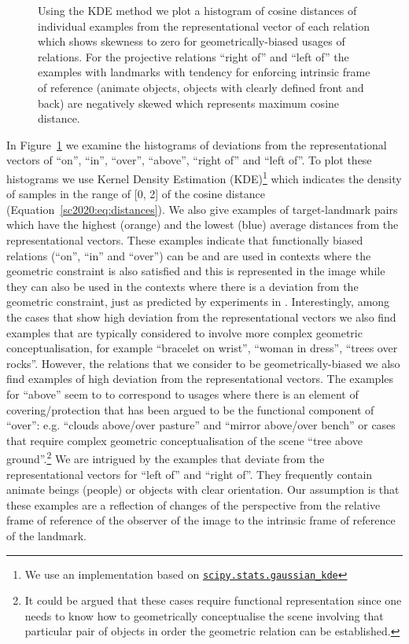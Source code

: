 \begin{figure}
\begin{minipage}{0.5\textwidth}
	\end{minipage}%
	\caption{Using the KDE method we plot a histogram of cosine distances of individual examples from the representational vector of each relation which shows skewness to zero for geometrically-biased usages of relations. For the projective relations ``right of'' and ``left of'' the examples with landmarks with tendency for enforcing intrinsic frame of reference (animate objects, objects with clearly defined front and back) are negatively skewed which represents maximum cosine distance. %
        }\label{sc2020:fig:what_hist}
\end{figure}




In Figure~\ref{sc2020:fig:what_hist} we examine the histograms of deviations
from the representational vectors of ``on'', ``in'', ``over'',
``above'', ``right of'' and ``left of''.  To plot these histograms we
use Kernel Density Estimation (KDE)\footnote{We use an implementation based on  \href{https://docs.scipy.org/doc/scipy/reference/generated/scipy.stats.gaussian_kde.html}{\texttt{scipy.stats.gaussian\_kde}}} \cite{scott2015multivariate} which
indicates the density of samples in the range of [0, 2] of the cosine
distance (Equation~\ref{sc2020:eq:distances}). We also give examples of
target-landmark pairs which have the highest (orange) and the lowest
(blue) average distances from the representational vectors. These
examples indicate that functionally biased relations (``on'', ``in''
and ``over'') can be and are used in contexts where the geometric
constraint is also satisfied and this is represented in the image
while they can also be used in the contexts where there is a deviation
from the geometric constraint, just as predicted by experiments in
\cite{CoventryEtAl:2001}. Interestingly, among the cases that show
high deviation from the representational vectors we also find examples
that are typically considered to involve more complex geometric
conceptualisation, for example ``bracelet on wrist'', ``woman in
dress'', ``trees over rocks''. However, the relations that we consider
to be geometrically-biased we also find examples of high deviation
from the representational vectors. The examples for ``above'' seem to
to correspond to usages where there is an element of
covering/protection that has been argued to be the functional
component of ``over'': e.g. ``clouds above/over pasture'' and ``mirror
above/over bench'' or cases that require complex geometric
conceptualisation of the scene ``tree above ground''.\footnote{It
  could be argued that these cases require functional representation
  since one needs to know how to geometrically conceptualise the scene
  involving that particular pair of objects in order the geometric
  relation can be established.} We are intrigued by the examples that
deviate from the representational vectors for ``left of'' and ``right
of''. They frequently contain animate beings (people) or objects with
clear orientation. Our assumption is that these examples are a
reflection of changes of the perspective from the relative frame of
reference of the observer of the image to the intrinsic frame of
reference of the landmark.



